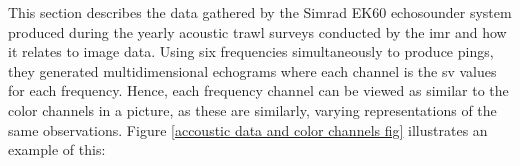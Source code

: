     
    This section describes the data gathered by the Simrad EK60 echosounder system produced during the yearly acoustic trawl surveys conducted by the \gls{imr}\cite{johnsen2017collective} and how it relates to image data. Using six frequencies simultaneously to produce pings, they generated multidimensional echograms where each channel is the \gls{sv} values for each frequency. Hence, each frequency channel can be viewed as similar to the color channels in a picture, as these are similarly, varying representations of the same observations. Figure \ref{accoustic data and color channels fig} illustrates an example of this:
    
    
    
    
